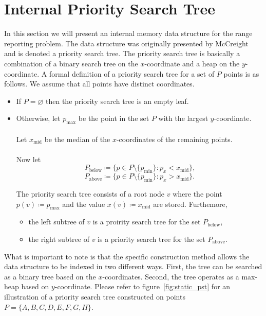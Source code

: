 \documentclass[twoside,11pt,openright]{report}
\begin{document}
\chapter{Internal Priority Search Tree}
In this section we will present an internal memory data structure for the range reporting problem. The data structure was originally presented by McCreight~\cite{DBLP:journals/siamcomp/McCreight85} and is denoted a priority search tree. The priority search tree is basically a combination of a binary search tree on the $x$-coordinate and a heap on the $y$-coordinate. A formal definition of a priority search tree for a set of $P$ points is as follows. We assume that all points have distinct coordinates.

\begin{itemize}
	\item If $P = \varnothing$ then the priority search tree is an empty leaf.
	\item Otherwise, let $p_\text{max}$ be the point in the set $P$ with the largest $y$-coordinate. \\ \\
			Let $x_{\text{mid}}$ be the median of the $x$-coordinates of the remaining points. \\ \\ Now let
			$$ P_\text{below} \coloneqq \{p \in P \setminus \{p_\text{min} \} : p_x < x_\text{mid} \}\text{,}$$
			$$ P_\text{above} \coloneqq \{p \in P \setminus \{p_\text{min} \} : p_x > x_\text{mid} \}\text{.}$$
			
			The priority search tree consists of a root node $v$ where the point \\
			$p(v) \coloneqq p_{\text{max}}$ and the value $x(v) \coloneqq x_{\text{mid}}$ are stored. Furthemore,
			\begin{itemize}[label=$\bullet$]
				\item the left subtree of $v$ is a proirity search tree for the set $P_{\text{below}}$,
				\item the right subtree of $v$ is a priority search tree for the set $P_{\text{above}}$.
			\end{itemize}
\end{itemize}

What is important to note is that the specific construction method allows the data structure to be indexed in two different ways. First, the tree can be searched as a binary tree based on the $x$-coordinates. Second, the tree operates as a max-heap based on $y$-coordinate. Please refer to figure~\ref{fig:static_pst} for an illustration of a priority search tree constructed on points $P = \{A, B, C, D, E, F, G, H\}$.
\end{document}
